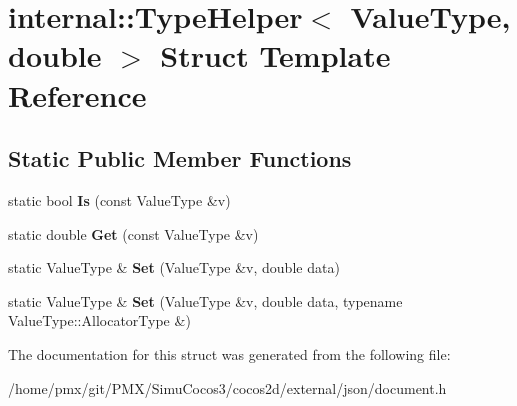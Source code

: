 \hypertarget{structinternal_1_1TypeHelper_3_01ValueType_00_01double_01_4}{}\section{internal\+:\+:Type\+Helper$<$ Value\+Type, double $>$ Struct Template Reference}
\label{structinternal_1_1TypeHelper_3_01ValueType_00_01double_01_4}
\subsection*{Static Public Member Functions}
\begin{DoxyCompactItemize}
\item 
\mbox{\label{structinternal_1_1TypeHelper_3_01ValueType_00_01double_01_4_a6c265a3202beb9bd85ecc7896a8ab9dd}} 
static bool {\bfseries Is} (const Value\+Type \&v)
\item 
\mbox{\label{structinternal_1_1TypeHelper_3_01ValueType_00_01double_01_4_ac55a96d2abd1dd6718a6cb3d6690aa38}} 
static double {\bfseries Get} (const Value\+Type \&v)
\item 
\mbox{\label{structinternal_1_1TypeHelper_3_01ValueType_00_01double_01_4_a2b332dd6083278283289e107caff879b}} 
static Value\+Type \& {\bfseries Set} (Value\+Type \&v, double data)
\item 
\mbox{\label{structinternal_1_1TypeHelper_3_01ValueType_00_01double_01_4_a69f7d942a569f3acdeb64127b2ecd9eb}} 
static Value\+Type \& {\bfseries Set} (Value\+Type \&v, double data, typename Value\+Type\+::\+Allocator\+Type \&)
\end{DoxyCompactItemize}


The documentation for this struct was generated from the following file\+:\begin{DoxyCompactItemize}
\item 
/home/pmx/git/\+P\+M\+X/\+Simu\+Cocos3/cocos2d/external/json/document.\+h\end{DoxyCompactItemize}

